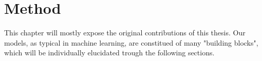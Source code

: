 \chapter{Method}
This chapter will mostly expose the original contributions
of this thesis. Our models, as typical in machine learning,
are constitued of many "building blocks", which will
be individually elucidated trough the following sections.





